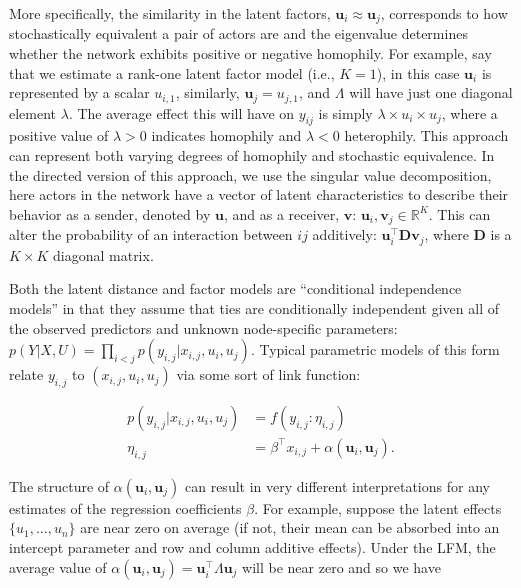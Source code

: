 \documentclass[12pt,pdflatex]{elsarticle}
\begin{document}
More specifically, the similarity in the latent factors, $\textbf{u}_{i} \approx \textbf{u}_{j}$, corresponds to how stochastically equivalent a pair of actors are and the eigenvalue determines whether the network exhibits positive or negative homophily. For example, say that we estimate a rank-one latent factor model (i.e., $K=1$), in this case $\textbf{u}_{i}$ is represented by a scalar $u_{i,1}$, similarly, $\textbf{u}_{j}=u_{j,1}$, and $\Lambda$ will have just one diagonal element $\lambda$. The average effect this will have on $y_{ij}$ is simply $\lambda \times u_{i} \times u_{j}$, where a positive value of $\lambda>0$ indicates homophily and $\lambda<0$ heterophily. This approach can represent both varying degrees of homophily and stochastic equivalence. In the directed version of this approach, we use the singular value decomposition, here actors in the network have a vector of latent characteristics to describe their behavior as a sender, denoted by $\textbf{u}$, and as a receiver, $\textbf{v}$: $\textbf{u}_{i}, \textbf{v}_{j} \in \mathbb{R}^{K}$. This can alter the probability of an interaction between $ij$ additively: $\textbf{u}_{i}^{\top} \textbf{D} \textbf{v}_{j}$, where $\textbf{D}$ is a $K \times K$ diagonal matrix.

Both the latent distance and factor models are ``conditional independence models'' in that they assume that ties are conditionally independent given all of the observed predictors and unknown node-specific parameters: $p( Y | X , U ) = \prod_{i<j} p( y_{i,j}  | x_{i,j} , u_i , u_j)$. Typical parametric models of this form relate $y_{i,j}$ to $(x_{i,j},u_i,u_j)$ via some sort of link function:

\begin{align*}
	p(y_{i,j} | x_{i,j}, u_i , u_j ) & = f( y_{i,j} : \eta_{i,j} ) \\
	\eta_{i,j} &= \beta^\top x_{i,j} + \alpha(\textbf{u}_{i}, \textbf{u}_{j}).
\end{align*}

The structure of $\alpha(\textbf{u}_{i}, \textbf{u}_{j})$ can result in very different interpretations for any estimates of the regression coefficients $\beta$. For example, suppose the latent effects $\{ u_1,\ldots, u_n\}$ are near zero on average (if not, their mean can be absorbed into an intercept parameter and row and column additive effects). Under the LFM, the average value of $\alpha(\textbf{u}_{i}, \textbf{u}_{j}) = \textbf{u}_{i}^{\top} \Lambda \textbf{u}_{j}$ will be near zero and so we have
\end{document}
